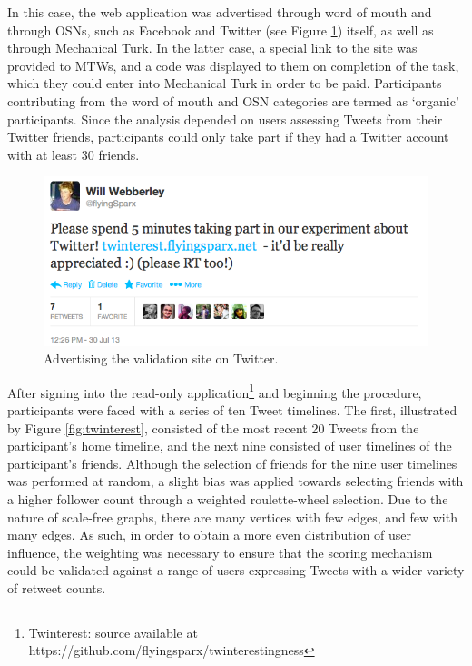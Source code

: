 In this case, the web application was advertised through word of mouth and through OSNs, such as Facebook and Twitter (see Figure \ref{fig:organic_advertising}) itself, as well as through Mechanical Turk. In the latter case, a special link to the site was provided to MTWs, and a code was displayed to them on completion of the task, which they could enter into Mechanical Turk in order to be paid. Participants contributing from the word of mouth and OSN categories are termed as `organic' participants. Since the analysis depended on users assessing Tweets from their Twitter friends, participants could only take part if they had a Twitter account with at least 30 friends.

\begin{figure}[h]
\centering
\includegraphics[scale=0.5]{5.Chapter3/Media/organic_advertising.png} 
\caption{Advertising the validation site on Twitter.}
\label{fig:organic_advertising}
\end{figure}

After signing into the read-only application\footnote{Twinterest: source available at https://github.com/flyingsparx/twinterestingness} and beginning the procedure, participants were faced with a series of ten Tweet timelines. The first, illustrated by Figure \ref{fig:twinterest}, consisted of the most recent 20 Tweets from the participant's home timeline, and the next nine consisted of user timelines of the participant's friends. Although the selection of friends for the nine user timelines was performed at random, a slight bias was applied towards selecting friends with a higher follower count through a weighted roulette-wheel selection.  Due to the nature of scale-free graphs, there are many vertices with few edges, and few with many edges. As such, in order to obtain a more even distribution of user influence, the weighting was necessary to ensure that the scoring mechanism could be validated against a range of users expressing Tweets with a wider variety of retweet counts.

